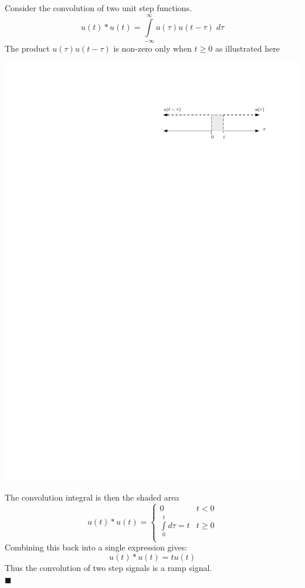 \begin{example}[$u(t) * u(t)$] Consider the convolution of two unit step functions.
  \[
  u(t) * u(t) = \int\limits_{-\infty}^{\infty} u(\tau)u(t-\tau) \; d\tau
  \]
  The product $u(\tau) u(t-\tau)$ is non-zero only when $t\geq 0$ as illustrated here
  \begin{center}
  \includegraphics[scale=1]{graphics/convolution-step.pdf}
\end{center}
  The convolution integral is then the shaded area
  \[
u(t) * u(t) = \left\{ \begin{array}{lc}
  0 & t< 0\\
  \int\limits_{0}^{t} d\tau = t  & t \geq 0\\
\end{array}\right.
\]
Combining this back into a single expression gives:
\[
u(t) * u(t) = tu(t)
\]
Thus the convolution of two step signals is a ramp signal.\\$\blacksquare$
\end{example}

